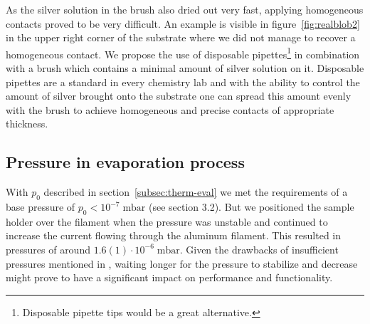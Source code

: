 As the silver solution in the brush also dried out very fast, applying homogeneous contacts proved to be very difficult. An example is visible in figure~\ref{fig:realblob2} in the upper right corner of the substrate where we did not manage to recover a homogeneous contact.\mypar
We propose the use of disposable pipettes\footnote{Disposable pipette tips would be a great alternative.} in combination with a brush which contains a minimal amount of silver solution on it. Disposable pipettes are a standard in every chemistry lab and with the ability to control the amount of silver brought onto the substrate one can spread this amount evenly with the brush to achieve homogeneous and precise contacts of appropriate thickness.

\subsection{Pressure in evaporation process}

With $p_0$ described in section~\ref{subsec:therm-eval} we met the requirements of a base pressure of $p_0<10^{-7}\;\text{mbar}$ (see \cite{labdesc} section 3.2). But we positioned the sample holder over the filament when the pressure was unstable and continued to increase the current flowing through the aluminum filament. This resulted in pressures of around $1.6(1)\cdot10^{-6}\;\text{mbar}$.\mypar
Given the drawbacks of insufficient pressures mentioned in \cite{labdesc}, waiting longer for the pressure to stabilize and decrease might prove to have a significant impact on performance and functionality.






